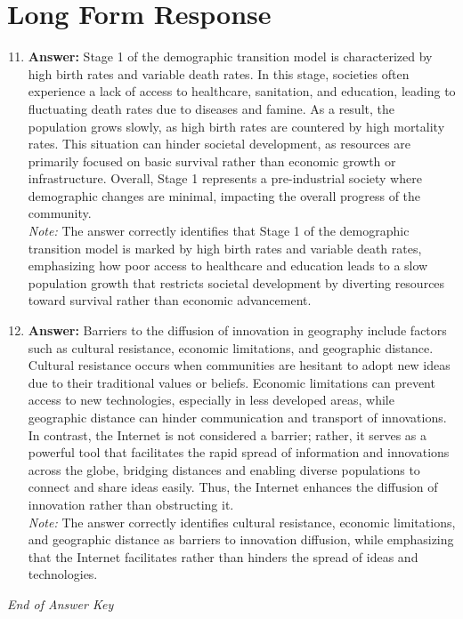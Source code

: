 \documentclass[12pt]{article}
\begin{document}
\section*{Long Form Response}
\begin{enumerate}[label=\arabic*.]
\setcounter{enumi}{10}
\item \textbf{Answer:} Stage 1 of the demographic transition model is characterized by high birth rates and variable death rates. In this stage, societies often experience a lack of access to healthcare, sanitation, and education, leading to fluctuating death rates due to diseases and famine. As a result, the population grows slowly, as high birth rates are countered by high mortality rates. This situation can hinder societal development, as resources are primarily focused on basic survival rather than economic growth or infrastructure. Overall, Stage 1 represents a pre-industrial society where demographic changes are minimal, impacting the overall progress of the community.
\\ \textit{Note:} The answer correctly identifies that Stage 1 of the demographic transition model is marked by high birth rates and variable death rates, emphasizing how poor access to healthcare and education leads to a slow population growth that restricts societal development by diverting resources toward survival rather than economic advancement.
\item \textbf{Answer:} Barriers to the diffusion of innovation in geography include factors such as cultural resistance, economic limitations, and geographic distance. Cultural resistance occurs when communities are hesitant to adopt new ideas due to their traditional values or beliefs. Economic limitations can prevent access to new technologies, especially in less developed areas, while geographic distance can hinder communication and transport of innovations. In contrast, the Internet is not considered a barrier; rather, it serves as a powerful tool that facilitates the rapid spread of information and innovations across the globe, bridging distances and enabling diverse populations to connect and share ideas easily. Thus, the Internet enhances the diffusion of innovation rather than obstructing it.
\\ \textit{Note:} The answer correctly identifies cultural resistance, economic limitations, and geographic distance as barriers to innovation diffusion, while emphasizing that the Internet facilitates rather than hinders the spread of ideas and technologies.
\end{enumerate}

\vfill
\noindent\textit{End of Answer Key}
\end{document}
